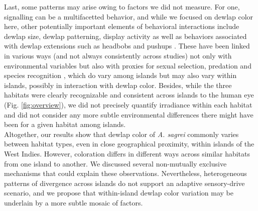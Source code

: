 Last, some patterns may arise owing to factors we did not measure. For one, signalling can be a multifacetted behavior, and while we focused on dewlap color here, other potentially important elements of behavioral interactions include dewlap size, dewlap patterning, display activity as well as behaviors associated with dewlap extensions such as headbobs and pushups \citep{Vanhooydonck2005, Driessens2014, Driessens2015, Lailvaux2015}. These have been linked in various ways (and not always consistently across studies) not only with environmental variables but also with proxies for sexual selection, predation and species recognition \citep{Vanhooydonck2005, Lailvaux2007, Vanhooydonck2009, Driessens2017, Baeckens2018}, which do vary among islands but may also vary within islands, possibly in interaction with dewlap color. Besides, while the three habitats were clearly recognizable and consistent across islands to the human eye (Fig. \ref{fig:overview}), we did not precisely quantify irradiance within each habitat and did not consider any more subtle environmental differences there might have been for a given habitat among islands.\\

Altogether, our results show that dewlap color of \textit{A. sagrei} commonly varies between habitat types, even in close geographical proximity, within islands of the West Indies. However, coloration differs in different ways across similar habitats from one island to another. We discussed several non-mutually exclusive mechanisms that could explain these observations. Nevertheless, heterogeneous patterns of divergence across islands do not support an adaptive sensory-drive scenario, and we propose that within-island dewlap color variation may be underlain by a more subtle mosaic of factors.